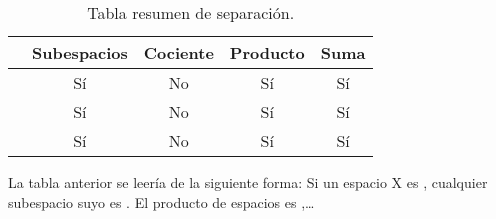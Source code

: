 \begin{table}[h]
	\centering
	\begin{tabular}{l|c|c|c|c|}
		\cline{2-5}
		& \multicolumn{1}{l|}{\textbf{Subespacios}} & \multicolumn{1}{l|}{\textbf{Cociente}} & \multicolumn{1}{l|}{\textbf{Producto}} & \multicolumn{1}{l|}{\textbf{Suma}} \\ \hline
		\multicolumn{1}{|l|}{\kolmogorov} & Sí                               & No                            & Sí                            & Sí                        \\ \hline
		\multicolumn{1}{|l|}{\frechet} & Sí                               & No                            & Sí                            & Sí                        \\ \hline
		\multicolumn{1}{|l|}{\hausdorff} & Sí                               & No                            & Sí                            & Sí                        \\ \hline
	\end{tabular}
	\caption{Tabla resumen de separación.}
	\label{Tabla_separacion}
\end{table}
La tabla anterior se leería de la siguiente forma: Si un espacio X es \kolmogorov, cualquier subespacio suyo es \kolmogorov. El producto de espacios \kolmogorov es \kolmogorov,\dots